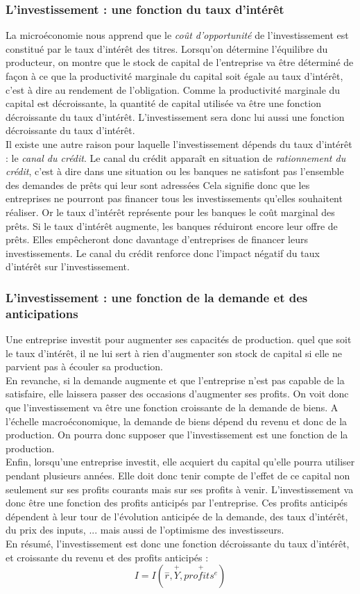 \documentclass[10pt]{book}
\begin{document}
\subsubsection{L'investissement : une fonction du taux d'intérêt}
La microéconomie nous apprend que le \textit{coût d'opportunité} de l'investissement est constitué par le taux d'intérêt des titres. Lorsqu'on détermine l'équilibre du producteur, on montre que le stock de capital de l'entreprise va être déterminé de façon à ce que la productivité marginale du capital soit égale au taux d'intérêt,  c'est à dire au rendement de l'obligation. Comme la productivité marginale du capital est décroissante, la quantité de capital utilisée va être une fonction décroissante du taux d'intérêt. L'investissement sera donc lui aussi une fonction décroissante du taux d'intérêt. \\
Il existe une autre raison pour laquelle l'investissement dépends du taux d'intérêt : le \textit{canal du crédit}. Le canal du crédit apparaît en situation de \textit{rationnement du crédit}, c'est à dire dans une situation ou les banques ne satisfont pas l'ensemble des demandes de prêts qui leur sont adressées Cela signifie donc que les entreprises ne pourront pas financer tous les investissements qu'elles souhaitent réaliser. Or le taux d'intérêt représente pour les banques le coût marginal des prêts. Si le taux d'intérêt augmente, les banques réduiront encore leur offre de prêts. Elles empêcheront donc davantage d'entreprises de financer leurs investissements. Le canal du crédit renforce donc l'impact négatif du taux d'intérêt sur l'investissement.
\subsubsection{L'investissement : une fonction de la demande et des anticipations}
Une entreprise investit pour augmenter ses capacités de production. quel que soit le taux d'intérêt, il ne lui sert à rien d'augmenter son stock de capital si elle ne parvient pas à écouler sa production. \\
En revanche, si la demande augmente et que l'entreprise n'est pas capable de la satisfaire, elle laissera passer des occasions d'augmenter ses profits. On voit donc que l'investissement va être une fonction croissante de la demande de biens. A l'échelle macroéconomique, la demande de biens dépend du revenu et donc de la production. On pourra donc supposer que l'investissement est une fonction de la production. \\
Enfin, lorsqu'une entreprise investit, elle acquiert du capital qu'elle pourra utiliser pendant plusieurs années. Elle doit donc tenir compte de l'effet de ce capital non seulement sur ses profits courants mais sur ses profits à venir. L'investissement va donc être une fonction des profits anticipés par l'entreprise. Ces profits anticipés dépendent à leur tour de l'évolution anticipée de la demande, des taux d'intérêt, du prix des inputs, ... mais aussi de l'optimisme des investisseurs.
 \\
En résumé, l'investissement est donc une fonction décroissante du taux d'intérêt, et croissante du revenu et des profits anticipés :
$$ I = I\left(\overset{-}{r}, \overset{+}{Y}, \overset{+}{profits^e}\right)$$
\end{document}
